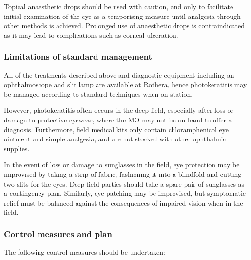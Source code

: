 \documentclass[12pt,a4paper]{article}
\begin{document}
Topical anaesthetic drops should be used with caution, and only to facilitate initial examination of the eye as a temporising measure until analgesia through other methods is achieved. Prolonged use of anaesthetic drops is contraindicated as it may lead to complications such as corneal ulceration.\cite{Patel:2013ki}

\subsubsection{Limitations of standard management}

All of the treatments described above and diagnostic equipment including an ophthalmoscope and slit lamp are available at Rothera, hence photokeratitis may be managed according to standard techniques when on station.\cite{Marquis:2013vg}

However, photokeratitis often occurs in the deep field, especially after loss or damage to protective eyewear, where the MO may not be on hand to offer a diagnosis. Furthermore, field medical kits only contain chloramphenicol eye ointment and simple analgesia, and are not stocked with other ophthalmic supplies.\cite{Marquis:2013vg}

In the event of loss or damage to sunglasses in the field, eye protection may be improvised by taking a strip of fabric, fashioning it into a blindfold and cutting two slits for the eyes.\cite{Wiseman:2003wx} Deep field parties should take a spare pair of sunglasses as a contingency plan. Similarly, eye patching may be improvised, but symptomatic relief must be balanced against the consequences of impaired vision when in the field.

\subsubsection{Control measures and plan}

The following control measures should be undertaken:
\end{document}
